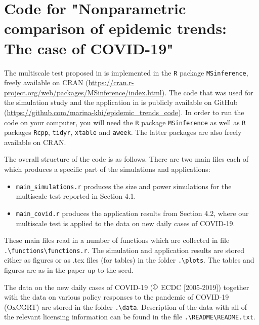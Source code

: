 \documentclass[a4paper,12pt]{article}
\begin{document}
\renewcommand{\baselinestretch}{1.2}\normalsize



\section{Code for "Nonparametric comparison of epidemic trends: The case of COVID-19"}

The multiscale test proposed in \cite{KhismatullinaVogt2023} is implemented in the \verb|R| package \verb|MSinference|, freely available on CRAN (\url{https://cran.r-project.org/web/packages/MSinference/index.html}). The code that was used for the simulation study and the application in \cite{KhismatullinaVogt2023} is publicly available on GitHub (\url{https://github.com/marina-khi/epidemic_trends_code}). In order to run the code on your computer, you will need the \verb|R| package \verb|MSinference| as well as \verb|R| packages \verb|Rcpp|, \verb|tidyr|, \verb|xtable| and \verb|aweek|. The latter packages are also freely available on CRAN.


The overall structure of the code is as follows. There are two main files each of which produces a specific part of the simulations and applications:

\begin{itemize}
\item \verb|main_simulations.r| produces the size and power simulations for the multiscale test reported in Section 4.1.
\item \verb|main_covid.r| produces the application results from Section 4.2, where our multiscale test is applied to the data on new daily cases of COVID-19.
\end{itemize}

These main files read in a number of functions which are collected in file \linebreak \verb|.\functions\functions.r|. The simulation and application results are stored either as figures or as .tex files (for tables) in the folder \verb|.\plots|. The tables and figures are as in the paper up to the seed.

The data on the new daily cases of COVID-19 ($\copyright$ ECDC [2005-2019]) together with the data on various policy responses to the pandemic of COVID-19 (OxCGRT) are stored in the folder \verb|.\data|. Description of the data with all of the relevant licensing information can be found in the file \verb|.\README\README.txt|.

\end{document}
